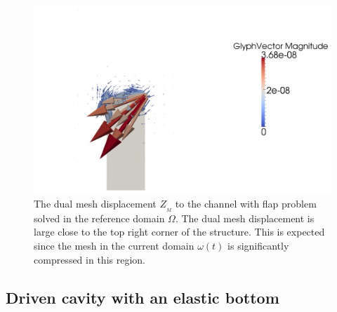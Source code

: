 \begin{figure}
\bwfig
  \centering
  \includegraphics[width=\largefig]{chapters/selim/png/channelZM.png}
  \caption{The dual mesh displacement $Z_{_{M}}$ to the channel with
    flap problem solved in the reference domain $\Omega$. The dual mesh
      displacement is large close to the top right corner of the
      structure. This is expected since the mesh in the current domain
      $\omega(t)$ is significantly compressed in this region.}
  \label{selim:fig:dual_channel_2}
\end{figure}

\subsection{Driven cavity with an elastic bottom}

